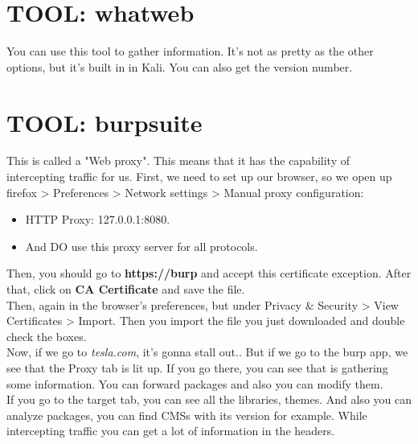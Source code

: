 \documentclass[11pt,a4paper]{article}
\begin{document}
\section{TOOL: whatweb}
You can use this tool to gather information. It's not as pretty as the other options, but it's built in in Kali. You can also get the version number.

\section{TOOL: burpsuite}
This is called a "Web proxy". This means that it has the capability of intercepting traffic for us. First, we need to set up our browser, so we open up firefox > Preferences > Network settings > Manual proxy configuration:
\begin{itemize}
\item HTTP Proxy: 127.0.0.1:8080.
\item And DO use this proxy server for all protocols.
\end{itemize}
Then, you should go to \textbf{https://burp} and accept this certificate exception. After that, click on \textbf{CA Certificate} and save the file.\\

Then, again in the browser's preferences, but under Privacy \& Security > View Certificates > Import. Then you import the file you just downloaded and double check the boxes.\\

Now, if we go to \textit{tesla.com}, it's gonna stall out.. But if we go to the burp app, we see that the Proxy tab is lit up. If you go there, you can see that is gathering some information. You can forward packages and also you can modify them.\\

If you go to the target tab, you can see all the libraries, themes. And also you can analyze packages, you can find CMSs with its version for example. While intercepting traffic you can get a lot of information in the headers.
\end{document}
